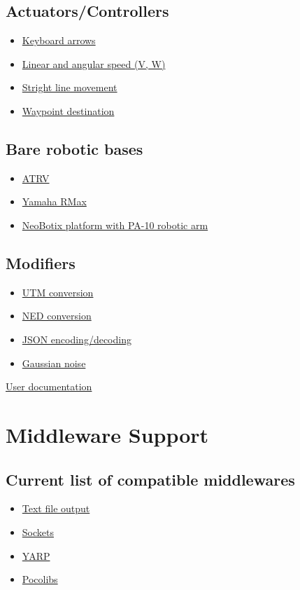 \documentclass[twoside,a4paper,10pt]{report}
\newcommand{\dokutitlelevelone}[1]{\chapter{#1}}
\newcommand{\dokutitleleveltwo}[1]{\section{#1}}
\newcommand{\dokuitem}{\item}
\newcommand{\dokuquoting}{\textbar}
\begin{document}
\dokutitleleveltwo{Actuators/Controllers}
\label{2068e59180763f350d66a42e828e7f96}%

\begin{itemize}
\dokuitem  \hyperref[388a56dbb62a010dc26a378981346247]{ Keyboard arrows}
\dokuitem  \hyperref[cdf7afd8bc8dbb764b14c987cea8effd]{ Linear and angular speed (V, W)}
\dokuitem  \hyperref[6990a54322d9232390a784c5c9247dd6]{ Stright line movement}
\dokuitem  \hyperref[f75862c2bd0040eb683048c313dcaaa8]{ Waypoint destination}
\end{itemize}

\dokutitleleveltwo{Bare robotic bases}
\label{d69ac14cd721dd995822d4e984f48116}%

\begin{itemize}
\dokuitem  \hyperref[4fd87f5742582d412dce2c6ad5304937]{ ATRV}
\dokuitem  \hyperref[311954cf2f831f2289fb7fff75d15a7d]{ Yamaha RMax}
\dokuitem  \hyperref[3c16132d99703978dacd02b0808a4270]{ NeoBotix platform with PA-10 robotic arm}
\end{itemize}

\dokutitleleveltwo{Modifiers}
\label{bf24b44a8cc99e648657b164c8aba758}%

\begin{itemize}
\dokuitem  \hyperref[b32d6491ce03dd4e6c877f3bfd9ff07e]{ UTM conversion}
\dokuitem  \hyperref[f68daad189b2fffd0b8cab5e36ec9d96]{ NED conversion}
\dokuitem  \hyperref[466deec76ecdf5fca6d38571f6324d54]{ JSON encoding/decoding}
\dokuitem  \hyperref[304e2a3b544f6b9f267a151e1bcee487]{ Gaussian noise}
\end{itemize}
{\dokuquoting}{\dokuquoting} \hyperref[a80da1282f2c775bbc5f2c92c836968b]{ User documentation}


\dokutitlelevelone{Middleware Support}
\label{4303941a1597ae94654bd96854480742}%
\label{9a05db9c4b60b0527010fd997682f523}%

\dokutitleleveltwo{Current list of compatible middlewares}
\label{92515de7e8c9f43d6ca122cbbfd1809e}%

\begin{itemize}
\dokuitem  \hyperref[1cb251ec0d568de6a929b520c4aed8d1]{ Text file output}
\dokuitem  \hyperref[61f2529360aec54f5dc9804b842cf3fa]{ Sockets}
\dokuitem  \hyperref[ec46d0b85077d7a7fe8da2e2b4c70462]{ YARP}
\dokuitem  \hyperref[15f13a3fccdd1ef095539316b61c03c8]{ Pocolibs}
\end{itemize}
\end{document}
